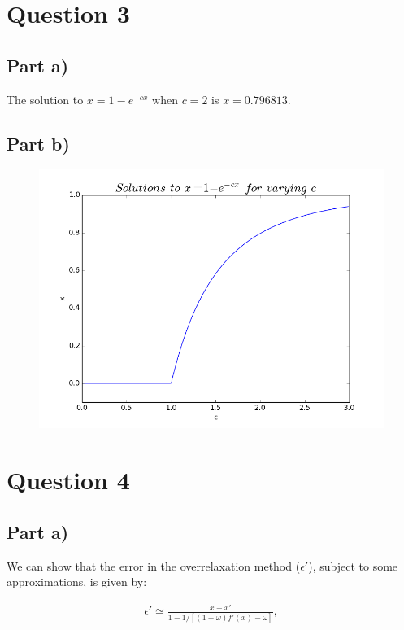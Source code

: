 \documentclass[a4paper,12pt]{article}
\begin{document}
\section{Question 3}

\subsection{Part a)}

The solution to $x = 1 - e^{-cx}$ when $c = 2$ is $x = 0.796813$.

\subsection{Part b)}

\begin{figure}[H]
\centering
\includegraphics[width = \linewidth]{lab4q3b.png}
\caption{}
\label{fig:q3}
\end{figure}

\section{Question 4}

\subsection{Part a)}

We can show that the error in the overrelaxation method ($\epsilon '$), subject to some approximations, is given by:

\begin{eqnarray}
\epsilon'\simeq \frac{x-x'}{1 - 1/[(1+\omega)f'(x)-\omega]},\label{eqn:eps}
\end{eqnarray}
\end{document}

